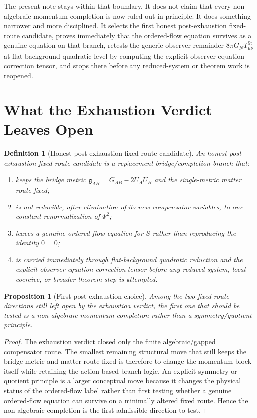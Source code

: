 \documentclass[11pt]{article}
\newcommand{\BridgeMetric}{\mathfrak{g}}
\newtheorem{definition}{Definition}
\newtheorem{proposition}{Proposition}
\begin{document}
The present note stays within that boundary. It does not claim that every non-algebraic momentum completion is now ruled out in principle. It does something narrower and more disciplined. It selects the first honest post-exhaustion fixed-route candidate, proves immediately that the ordered-flow equation survives as a genuine equation on that branch, retests the generic observer remainder \(8\pi G_NT_{\mu\nu}^{\mathrm{St}}\) at flat-background quadratic level by computing the explicit observer-equation correction tensor, and stops there before any reduced-system or theorem work is reopened.

\section{What the Exhaustion Verdict Leaves Open}

\begin{definition}[Honest post-exhaustion fixed-route candidate]
\label{def:honest}
An \emph{honest post-exhaustion fixed-route candidate} is a replacement bridge/completion branch that:
\begin{enumerate}
    \item keeps the bridge metric \(\BridgeMetric_{AB}=G_{AB}-2U_AU_B\) and the single-metric matter route fixed;
    \item is not reducible, after elimination of its new compensator variables, to one constant renormalization of \(\Psi^2\);
    \item leaves a genuine ordered-flow equation for \(S\) rather than reproducing the identity \(0=0\);
    \item is carried immediately through flat-background quadratic reduction and the explicit observer-equation correction tensor before any reduced-system, local-coercive, or broader theorem step is attempted.
\end{enumerate}
\end{definition}

\begin{proposition}[First post-exhaustion choice]
\label{prop:firstchoice}
Among the two fixed-route directions still left open by the exhaustion verdict, the first one that should be tested is a non-algebraic momentum completion rather than a symmetry/quotient principle.
\end{proposition}

\begin{proof}
The exhaustion verdict closed only the finite algebraic/gapped compensator route. The smallest remaining structural move that still keeps the bridge metric and matter route fixed is therefore to change the momentum block itself while retaining the action-based branch logic. An explicit symmetry or quotient principle is a larger conceptual move because it changes the physical status of the ordered-flow label rather than first testing whether a genuine ordered-flow equation can survive on a minimally altered fixed route. Hence the non-algebraic completion is the first admissible direction to test.
\end{proof}
\end{document}
